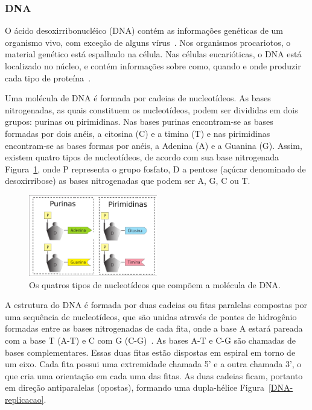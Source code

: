\subsubsection{DNA} \label{sec:DNA}

O ácido desoxirribonucléico (DNA) contém as informações genéticas de um organismo vivo, com exceção de alguns vírus~\citep{silva:2001}. Nos organismos procariotos, o material genético está espalhado na célula. Nas células eucarióticas, o DNA está localizado no núcleo, e contém informações sobre como, quando e onde produzir cada tipo de proteína~\citep{lodish:2005}.


Uma molécula de DNA é formada por cadeias de nucleotídeos. As bases nitrogenadas, as quais constituem os nucleotídeos, podem ser divididas em dois grupos: purinas ou pirimidinas. Nas bases purinas encontram-se as bases formadas por dois anéis, a citosina (C) e a timina (T) e nas pirimidinas encontram-se as bases formas por anéis, a Adenina (A) e a Guanina (G).
Assim, existem quatro tipos de nucleotídeos, de acordo com sua base nitrogenada Figura~\ref{fig:nucleotideoDNA}, onde P representa o grupo fosfato, D a pentose (açúcar denominado de desoxirribose) as bases nitrogenadas que podem ser A, G, C ou T.

\begin{figure}[ht]
\centering
\includegraphics[angle=0,width=0.5\textwidth]{imagens//2007eu-nucleotideoDNA1}
\caption{Os quatros tipos de nucleotídeos que compõem a molécula de DNA.\label{fig:nucleotideoDNA}}
\end{figure}

A estrutura do DNA é formada por duas cadeias ou fitas paralelas compostas por uma sequência de nucleotídeos, que são unidas através de pontes de hidrogênio formadas entre as bases nitrogenadas de cada fita, onde a base A estará pareada com a base T (A-T) e C com G (C-G)~\citep{stryer:2002}. As bases A-T e C-G são chamadas de bases complementares. Essas duas fitas estão dispostas em espiral em torno de um eixo. Cada fita possui uma extremidade chamada 5' e a outra chamada 3', o que cria uma orientação em cada uma das fitas. As duas cadeias ficam, portanto em direção antiparalelas (opostas), formando uma dupla-hélice Figura~\ref{DNA-replicacao}.


